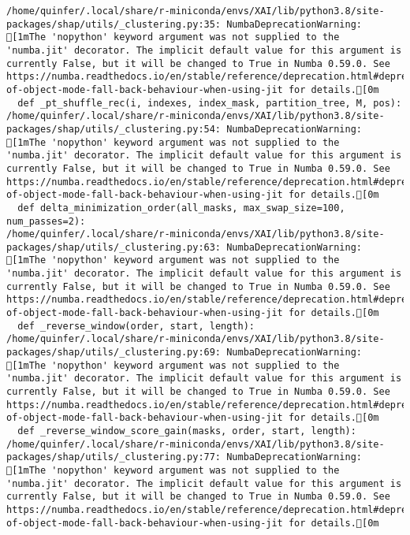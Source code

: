 \documentclass[
  letterpaper,
  DIV=11,
  numbers=noendperiod]{scrartcl}
\begin{document}
\begin{verbatim}
/home/quinfer/.local/share/r-miniconda/envs/XAI/lib/python3.8/site-packages/shap/utils/_clustering.py:35: NumbaDeprecationWarning: [1mThe 'nopython' keyword argument was not supplied to the 'numba.jit' decorator. The implicit default value for this argument is currently False, but it will be changed to True in Numba 0.59.0. See https://numba.readthedocs.io/en/stable/reference/deprecation.html#deprecation-of-object-mode-fall-back-behaviour-when-using-jit for details.[0m
  def _pt_shuffle_rec(i, indexes, index_mask, partition_tree, M, pos):
/home/quinfer/.local/share/r-miniconda/envs/XAI/lib/python3.8/site-packages/shap/utils/_clustering.py:54: NumbaDeprecationWarning: [1mThe 'nopython' keyword argument was not supplied to the 'numba.jit' decorator. The implicit default value for this argument is currently False, but it will be changed to True in Numba 0.59.0. See https://numba.readthedocs.io/en/stable/reference/deprecation.html#deprecation-of-object-mode-fall-back-behaviour-when-using-jit for details.[0m
  def delta_minimization_order(all_masks, max_swap_size=100, num_passes=2):
/home/quinfer/.local/share/r-miniconda/envs/XAI/lib/python3.8/site-packages/shap/utils/_clustering.py:63: NumbaDeprecationWarning: [1mThe 'nopython' keyword argument was not supplied to the 'numba.jit' decorator. The implicit default value for this argument is currently False, but it will be changed to True in Numba 0.59.0. See https://numba.readthedocs.io/en/stable/reference/deprecation.html#deprecation-of-object-mode-fall-back-behaviour-when-using-jit for details.[0m
  def _reverse_window(order, start, length):
/home/quinfer/.local/share/r-miniconda/envs/XAI/lib/python3.8/site-packages/shap/utils/_clustering.py:69: NumbaDeprecationWarning: [1mThe 'nopython' keyword argument was not supplied to the 'numba.jit' decorator. The implicit default value for this argument is currently False, but it will be changed to True in Numba 0.59.0. See https://numba.readthedocs.io/en/stable/reference/deprecation.html#deprecation-of-object-mode-fall-back-behaviour-when-using-jit for details.[0m
  def _reverse_window_score_gain(masks, order, start, length):
/home/quinfer/.local/share/r-miniconda/envs/XAI/lib/python3.8/site-packages/shap/utils/_clustering.py:77: NumbaDeprecationWarning: [1mThe 'nopython' keyword argument was not supplied to the 'numba.jit' decorator. The implicit default value for this argument is currently False, but it will be changed to True in Numba 0.59.0. See https://numba.readthedocs.io/en/stable/reference/deprecation.html#deprecation-of-object-mode-fall-back-behaviour-when-using-jit for details.[0m

\end{verbatim}
\end{document}
